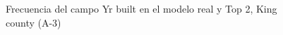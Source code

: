 \begin{figure}[H]
    \centering
    
    \caption{Frecuencia del campo Yr built en el modelo real y Top 2, King county (A-3)}
    \label{frecuency-top2-yr built}
\end{figure}